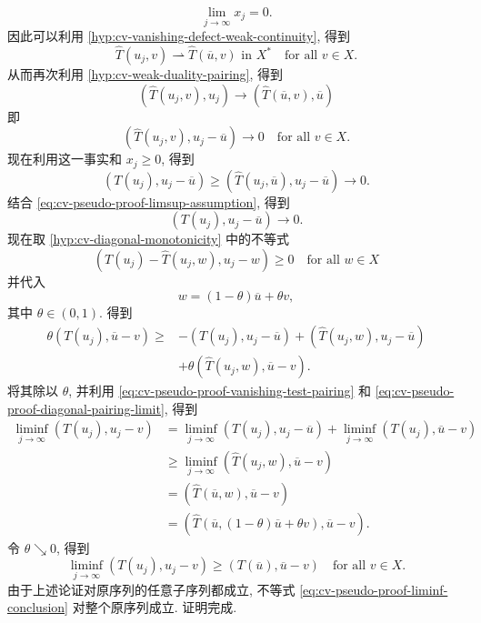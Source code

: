 \begin{Proof}
\begin{equation}\label{eq:cv-pseudo-proof-defect-vanishing}
\lim_{j\to\infty}x_j=0.
\end{equation}
因此可以利用 \ref{hyp:cv-vanishing-defect-weak-continuity}, 得到
\begin{equation}\label{eq:cv-pseudo-proof-test-image-limit}
\widehat T(u_j,v)\rightharpoonup\widehat T(\overline u,v)\text{ in }X^*\quad\text{for all }v\in X.
\end{equation}
从而再次利用 \ref{hyp:cv-weak-duality-pairing}, 得到\[(\widehat T(u_j,v),u_j)\to(\widehat T(\overline u,v),\overline u)\]即
\begin{equation}\label{eq:cv-pseudo-proof-vanishing-test-pairing}
(\widehat T(u_j,v),u_j-\overline u)\to0\quad\text{for all }v\in X.
\end{equation}
现在利用这一事实和 $x_j\geq0$, 得到
\begin{equation}\label{eq:cv-pseudo-proof-diagonal-comparison}
(T(u_j),u_j-\overline u)\geq(\widehat T(u_j,\overline u),u_j-\overline u)\to0.
\end{equation}
结合 \eqref{eq:cv-pseudo-proof-limsup-assumption}, 得到
\begin{equation}\label{eq:cv-pseudo-proof-diagonal-pairing-limit}
(T(u_j),u_j-\overline u)\to0.
\end{equation}
现在取 \ref{hyp:cv-diagonal-monotonicity} 中的不等式\[(T(u_j)-\widehat T(u_j,w),u_j-w)\geq0\quad\text{for all }w\in X\]并代入
\begin{equation}\label{eq:cv-pseudo-proof-intermediate-test-point}
w=(1-\theta)\overline u+\theta v,
\end{equation}
其中 $\theta\in(0,1)$. 得到
\begin{equation}\label{eq:cv-pseudo-proof-theta-inequality}
\begin{aligned}\theta(T(u_j),\overline u-v)\geq&-(T(u_j),u_j-\overline u)+(\widehat T(u_j,w),u_j-\overline u)\\&+\theta(\widehat T(u_j,w),\overline u-v).\end{aligned}
\end{equation}
将其除以 $\theta$, 并利用 \eqref{eq:cv-pseudo-proof-vanishing-test-pairing} 和 \eqref{eq:cv-pseudo-proof-diagonal-pairing-limit}, 得到\[\begin{aligned}
\liminf_{j\to\infty}(T(u_j),u_j-v)&=\liminf_{j\to\infty}(T(u_j),u_j-\overline u)+\liminf_{j\to\infty}(T(u_j),\overline u-v)\\
&\geq\liminf_{j\to\infty}(\widehat T(u_j,w),\overline u-v)\\
&=(\widehat T(\overline u,w),\overline u-v)\\
&=(\widehat T(\overline u,(1-\theta)\overline u+\theta v),\overline u-v).
\end{aligned}\]令 $\theta\searrow0$, 得到
\begin{equation}\label{eq:cv-pseudo-proof-liminf-conclusion}
\liminf_{j\to\infty}(T(u_j),u_j-v)\geq(T(\overline u),\overline u-v)\quad\text{for all }v\in X.
\end{equation}
由于上述论证对原序列的任意子序列都成立, 不等式 \eqref{eq:cv-pseudo-proof-liminf-conclusion} 对整个原序列成立. 证明完成.
\end{Proof}
\endgroup

